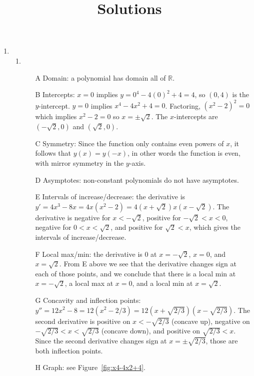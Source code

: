 \documentclass{article}
\title{\commonPSTitleZeroThreeFive\ Solutions}
\author{\commonAuthor}
\date{\commonDateZeroThreeFive}
\begin{document}
\maketitle
\begin{enumerate}
\item %
  \begin{enumerate}
  \item %
    \begin{itemize}
    \item[A] Domain: a polynomial has domain all of $\mathbb{R}$.
    \item[B] Intercepts: $x=0$ implies $y=0^4-4(0)^2+4=4$, so $(0,4)$
      is the $y$-intercept.  $y=0$ implies $x^4-4x^2+4=0$.  Factoring,
      $(x^2-2)^2=0$ which implies $x^2-2=0$ so $x=\pm\sqrt{2}$.  The
      $x$-intercepts are $(-\sqrt{2},0)$ and $(\sqrt{2},0)$.
    \item[C] Symmetry: Since the function only contains even powers of
      $x$, it follows that $y(x)=y(-x)$, in other words the function
      is even, with mirror symmetry in the $y$-axis.
    \item[D] Asymptotes: non-constant polynomials do not have
      asymptotes.
    \item[E] Intervals of increase/decrease: the derivative is
      $y'=4x^3-8x=4x(x^2-2)=4(x+\sqrt{2})x(x-\sqrt{2})$.  The
      derivative is negative for $x<-\sqrt{2}$, positive for
      $-\sqrt{2}<x<0$, negative for $0<x<\sqrt{2}$, and positive for
      $\sqrt{2}<x$, which gives the intervals of increase/decrease.
    \item[F] Local max/min: the derivative is $0$ at $x=-\sqrt{2}$,
      $x=0$, and $x=\sqrt{2}$.  From E above we see that the
      derivative changes sign at each of those points, and we conclude
      that there is a local min at $x=-\sqrt{2}$, a local max at
      $x=0$, and a local min at $x=\sqrt{2}$.
    \item[G] Concavity and inflection points:
      $y''=12x^2-8=12(x^2-2/3)=12(x+\sqrt{2/3})(x-\sqrt{2/3})$.  The
      second derivative is positive on $x<-\sqrt{2/3}$ (concave up),
      negative on $-\sqrt{2/3}<x<\sqrt{2/3}$ (concave down), and
      positive on $\sqrt{2/3}<x$.  Since the second derivative changes
      sign at $x=\pm\sqrt{2/3}$, those are both inflection points.
    \item[H] Graph: see Figure~\ref{fig:x4-4x2+4}.
    \end{itemize}
    \begin{figure}[htbp]
      \centering
      \begin{tikzpicture}

\end{tikzpicture}
\end{figure}
\end{enumerate}
\end{enumerate}
\end{document}
